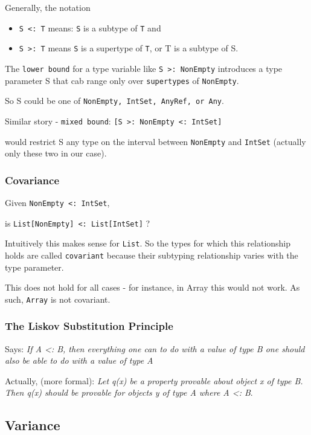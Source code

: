 \documentclass{scrartcl}
\newcommand{\term}[1]{\verb~#1~} %
\begin{document}
Generally, the notation
\begin{itemize}
\item \lstinline|S <: T| means: \lstinline|S| is a subtype of \lstinline|T| and
\item \lstinline|S >: T| means \lstinline|S| is a supertype of \lstinline|T|, or
  T is a subtype of S.
\end{itemize}

The \term{lower bound} for a type variable like \lstinline|S >: NonEmpty|
introduces a type parameter S that cab range only over \term{supertypes} of
\lstinline|NonEmpty|.

So S could be one of \lstinline|NonEmpty, IntSet, AnyRef, or Any|.

Similar story - \term{mixed bound}: \lstinline|[S >: NonEmpty <: IntSet]|

would restrict S any type on the interval between \lstinline|NonEmpty| and
\lstinline|IntSet| (actually only these two in our case).

\subsubsection{Covariance}
\label{sec:Covariance}

Given \lstinline|NonEmpty <: IntSet|,

is \lstinline|List[NonEmpty] <: List[IntSet]| ?

Intuitively this makes sense for \lstinline|List|. So the types for which this
relationship holds are called \term{covariant} because their subtyping
relationship varies with the type parameter.

This does not hold for all cases - for instance, in Array this would not work.
As such, \lstinline|Array| is not covariant.

\subsubsection{The Liskov Substitution Principle}
\label{sec:Liskov}

Says: {\it If A <: B, then everything one can to do with a value of type B one
  should also be able to do with a value of type A}

Actually, (more formal): {\it Let q(x) be a property provable about object x of
  type B. Then q(x) should be provable for objects y of type A where A <: B}.

\subsection{Variance}
\label{sec:Variance}
\end{document}
